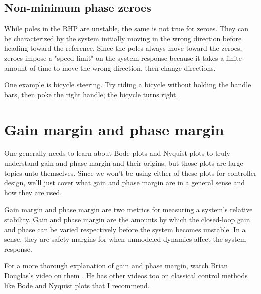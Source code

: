 \subsection{Non-minimum phase zeroes}

While poles in the RHP are unstable, the same is not true for zeroes. They can
be characterized by the \gls{system} initially moving in the wrong direction
before heading toward the \gls{reference}. Since the poles always move toward
the zeroes, zeroes impose a "speed limit" on the \gls{system} response because
it takes a finite amount of time to move the wrong direction, then change
directions.

One example is bicycle steering. Try riding a bicycle without holding the handle
bars, then poke the right handle; the bicycle turns right.

\section{Gain margin and phase margin} \label{sec:gain-phase-margin}

One generally needs to learn about Bode plots and Nyquist plots to truly
understand gain and phase margin and their origins, but those plots are large
topics unto themselves. Since we won't be using either of these plots for
controller design, we'll just cover what gain and phase margin are in a general
sense and how they are used.

Gain margin and phase margin are two metrics for measuring a system's relative
stability. Gain and phase margin are the amounts by which the closed-loop gain
and phase can be varied respectively before the system becomes unstable. In a
sense, they are safety margins for when unmodeled dynamics affect the system
response.

For a more thorough explanation of gain and phase margin, watch Brian Douglas's
video on them \cite{bib:gain_phase_margin}. He has other videos too on classical
control methods like Bode and Nyquist plots that I recommend.
